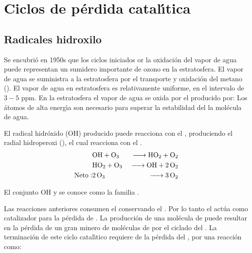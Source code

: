 \section[Ciclos de perdida catalitica]{Ciclos de p\'erdida catal\'{\i}tica}
\label{cpeoz}

\subsection{Radicales hidroxilo}
\label{roh}

Se encubri\'o en 1950s que los ciclos iniciados or la oxidaci\'on del vapor de agua puede representan un sumidero importante de ozono en la estratosfera. El vapor de agua se suministra a la estratosfera por el transporte y oxidaci\'on del metano (). El vapor de agua en estratosfera es relativamente uniforme, en el intervalo de $3-5$ ppm. En la estratosfera el vapor de agua se oxida por el  producido por:
Los \'atomos de alta energ\'{\i}a  son necesario para superar la estabilidad del la mol\'ecula de agua.

El radical hidr\'oxido (OH)  producido puede reacciona con el , produciendo el radial hidroperoxi (), el cual reacciona con el .
\begin{eqnarray*}
& \ce{OH + O3    & -> HO2 + O2 \\
      & HO2 +  O3   &-> OH + 2O2} \\
\mathrm{Neto: } &  \ce{2O3   &  ->  3O2}
\end{eqnarray*}

El conjunto OH y  se conoce como la familia .

Las reacciones anteriores consumen el  conservando el . Por lo tanto el  act\'ua como catalizador para la p\'erdida de . La producci\'on de una mol\'ecula de  puede resultar en la p\'erdida de un gran minero de mol\'eculas de  por el ciclado del . La terminaci\'on de este ciclo catal\'{\i}tico requiere de la p\'erdida del , por una reacci\'on como:

